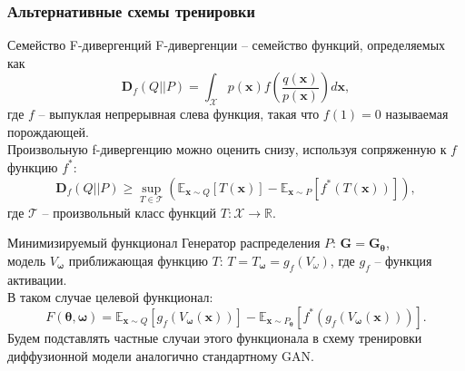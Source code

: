 \documentclass[8pt]{beamer}
\begin{document}
\begin{frame}
	\frametitle{Альтернативные схемы тренировки}
	\begin{block}{Семейство F-дивергенций}
		F-дивергенции -- семейство функций, определяемых как
		\begin{equation*}
				\textbf{D}_f(Q||P) = \int_\mathcal{X} p(\textbf{x}) f\left(\frac{q(\textbf{x})}{p(\textbf{x})}\right)d\textbf{x},
		\end{equation*}
		где $f$ -- выпуклая непрерывная слева функция, такая что $f(1) = 0$ называемая порождающей.\\
		Произвольную f-дивергенцию можно оценить снизу, используя сопряженную к $f$ функцию $f^*$:
		\begin{equation*}
			\textbf{D}_f(Q||P)\geqslant \sup\limits_{T \in \mathcal{T}}\left(\mathbb{E}_{\textbf{x}\sim Q} [T(\textbf{x})] - \mathbb{E}_{\textbf{x}\sim P} [f^*(T(\textbf{x}))] \right),
		\end{equation*}
		где $\mathcal{T}$ -- произвольный класс функций $T:\mathcal{X} \to \mathbb{R}$.
	\end{block}
	\begin{block}{Минимизируемый функционал}
		Генератор распределения $P$: $\textbf{G} = \textbf{G}_{\boldsymbol{\theta}}$, \\
		модель $V_{\boldsymbol{\omega}}$ приближающая функцию $T$: $T = T_{\boldsymbol{\omega}} = g_f(V_\omega)$, где $g_f$ --  функция активации. \\
		В таком случае целевой функционал: 
		\begin{equation*}
			F({\boldsymbol{\theta}}, {\boldsymbol{\omega}}) = \mathbb{E}_{\textbf{x}\sim Q} [g_f(V_{\boldsymbol{\omega}}(\textbf{x}))] - \mathbb{E}_{ \textbf{x}\sim P_{\boldsymbol{\theta}}}[f^*(g_f(V_{\boldsymbol{\omega}}(\textbf{x})))].
		\end{equation*}
		Будем подставлять частные случаи этого функционала в схему тренировки диффузионной модели аналогично стандартному GAN.
	\end{block}
\end{frame}
\end{document}
